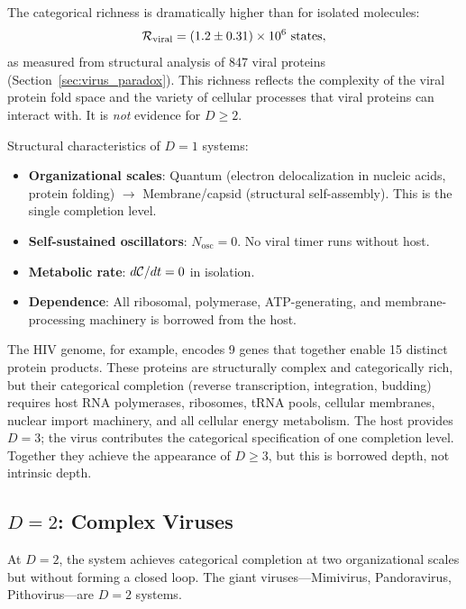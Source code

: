 The categorical richness is dramatically higher than for isolated molecules:
\begin{equation}
  \mathcal{R}_{\mathrm{viral}} = (1.2 \pm 0.31) \times 10^6 \text{ states},
  \label{eq:richness_D1}
\end{equation}
as measured from structural analysis of 847 viral proteins (Section~\ref{sec:virus_paradox}).
This richness reflects the complexity of the viral protein fold space and the
variety of cellular processes that viral proteins can interact with. It is
\emph{not} evidence for $D \geq 2$.

Structural characteristics of $D = 1$ systems:
\begin{itemize}
  \item \textbf{Organizational scales}: Quantum (electron delocalization in
        nucleic acids, protein folding) $\to$ Membrane/capsid (structural
        self-assembly). This is the single completion level.
  \item \textbf{Self-sustained oscillators}: $N_{\mathrm{osc}} = 0$. No viral
        timer runs without host.
  \item \textbf{Metabolic rate}: $d\mathcal{C}/dt = 0$ in isolation.
  \item \textbf{Dependence}: All ribosomal, polymerase, ATP-generating, and
        membrane-processing machinery is borrowed from the host.
\end{itemize}

The HIV genome, for example, encodes 9 genes that together enable 15 distinct
protein products. These proteins are structurally complex and categorically
rich, but their categorical completion (reverse transcription, integration,
budding) requires host RNA polymerases, ribosomes, tRNA pools, cellular
membranes, nuclear import machinery, and all cellular energy metabolism. The
host provides $D = 3$; the virus contributes the categorical specification
of one completion level. Together they achieve the appearance of $D \geq 3$,
but this is borrowed depth, not intrinsic depth.

\subsection{$D = 2$: Complex Viruses}

At $D = 2$, the system achieves categorical completion at two organizational
scales but without forming a closed loop. The giant viruses---Mimivirus,
Pandoravirus, Pithovirus---are $D = 2$ systems.

